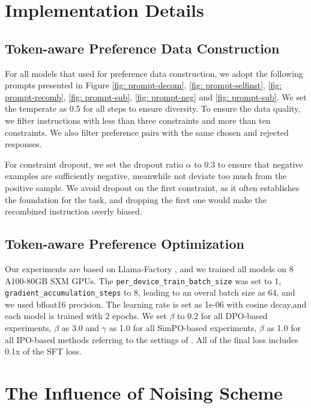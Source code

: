 \clearpage
\appendix
\onecolumn
\section{Implementation Details}
\subsection{Token-aware Preference Data Construction}
\label{sec:impl}
For all models that used for preference data construction, we adopt the following prompts presented in Figure \ref{fig: prompt-decom}, \ref{fig: prompt-selfinst}, \ref{fig: prompt-recomb}, \ref{fig: prompt-sub}, \ref{fig: prompt-neg} and \ref{fig: prompt-sub}. We set the temperate as 0.5 for all steps to ensure diversity. To ensure the data quality, we filter instructions with less than three constraints and more than ten constraints. We also filter preference pairs with the same chosen and rejected responses. 

For constraint dropout, we set the dropout ratio $\alpha$ to 0.3 to ensure that negative examples are sufficiently negative, meanwhile not deviate too much from the positive sample. We avoid dropout on the first constraint, as it often establishes the foundation for the task, and dropping the first one would make the recombined instruction overly biased.

\subsection{Token-aware Preference Optimization}
\label{sec:impl-dpo}
Our experiments are based on Llama-Factory \cite{zheng2024llamafactory}, and we trained all models on 8 A100-80GB SXM GPUs. The \texttt{per\_device\_train\_batch\_size} was set to 1, \texttt{gradient\_accumulation\_steps} to 8, leading to an overal batch size as 64, and we used bfloat16 precision. The learning rate is set as 1e-06 with cosine decay,and each model is trained with 2 epochs. We set $\beta$ to 0.2 for all DPO-based experiments, $\beta$ as 3.0 and $\gamma$ as 1.0 for all SimPO-based experiments, $\beta$ as 1.0 for all IPO-based methods referring to the settings of \citet{meng2024simpo}. All of the final loss includes 0.1x of the SFT loss.

\section{The Influence of Noising Scheme}
\label{app:noising}

